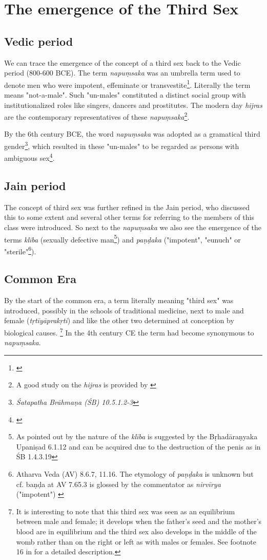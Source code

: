 \section{The emergence of the Third Sex}

\subsection{Vedic period}
We can trace the emergence of the concept of a third sex back to the Vedic period (800-600 BCE). The term {\em napuṃsaka} was an umbrella term used to denote men who were impotent, effeminate or transvestite\footnote{\cite{zwilling}}. Literally the term means "not-a-male". Such "un-males" constituted a distinct social group with institutionalized roles like singers, dancers and prostitutes. The modern day {\em hijras} are the contemporary representatives of these {\em napuṃsaka}\footnote{A good study on the {\em hijras} is provided by \cite{nanda}}.

By the 6th century BCE, the word {\em napuṃsaka} was adopted as a gramatical third gender\footnote{{\em Śatapatha Brāhmaṇa (ŚB) 10.5.1.2-3}}, which resulted in these "un-males" to be regarded as persons with ambiguous sex\footnote{\cite{zwilling2000}}. 

\subsection{Jain period}
The concept of third sex was further refined in the Jain period, who discussed this to some extent and several other terms for referring to the members of this class were introduced. So next to the {\em napuṃsaka} we also see the emergence of the terms {\em klība} (sexually defective man\footnote{As pointed out by \cite{zwilling} the nature of the {\em klība} is suggested by the Bṛhadāraṇyaka Upaniṣad 6.1.12 and can be acquired due to the destruction of the penis as in ŚB 1.4.3.19}) and {\em paṇḍaka} ("impotent", "eunuch" or "sterile"\footnote{Atharva Veda (AV) 8.6.7, 11.16. The etymology of {\em paṇḍaka} is unknown but cf. baṇḍa at AV 7.65.3 is glossed by the commentator as {\em nirvīrya} ("impotent") \cite{zwilling}}).

\subsection{Common Era}
By the start of the common era, a term literally meaning "third sex" was introduced, possibly in the schools of traditional medicine, next to male and female ({\em tṛtīyāprakṛti}) and like the other two determined at conception by biological causes. \footnote{It is interesting to note that this third sex was seen as an equilibrium between male and female; it develops when the father's seed and the mother's blood are in equilibrium and the third sex also develops in the middle of the womb rather than on the right or left as with males or females. See footnote 16 in \cite{zwilling} for a detailed description.} In the 4th century CE the term had become synonymous to {\em napuṃsaka}.

